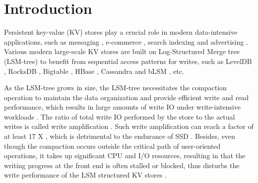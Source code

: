 \documentclass[sigconf]{acmart}
\begin{document}
\section{Introduction}
Persistent key-value (KV) stores play a crucial role in modern data-intensive applications, such as messaging \cite{HH,HBase}, e-commerce \cite{Dynamo}, search indexing \cite{LevelDB, Bigtable} and advertising \cite{RocksDB,PNUTS}. Various modern large-scale KV stores are built on Log-Structured Merge tree (LSM-tree) \cite{LSMtree} to benefit from sequential access patterns for writes, such as LevelDB \cite{LevelDB}, RocksDB \cite{RocksDB}, Bigtable \cite{Bigtable}, HBase \cite{HBase}, Cassandra \cite{Cassandra} and bLSM \cite{bLSM}, etc.

As the LSM-tree grows in size, the LSM-tree necessitates the compaction operation to maintain the data organization and provide efficient write and read performance, which results in large amounts of write IO under write-intensive workloads \cite{LevelDB, HyperLevelDB, RocksDB}. The ratio of total write IO performed by the store to the actual writes is called write amplification \cite{LevelDB, PebblesDB}. Such write amplification can reach a factor of at least 17 X \cite{Wisckey,PebblesDB}, which is detrimental to the endurance of SSD \cite{SSD, Wisckey, HashKV}. Besides, even though the compaction occurs outside the critical path of user-oriented operations, it takes up significant CPU and I/O resources, resulting in that the writing progress at the front end is often stalled or blocked, thus disturbs the write performance of the LSM structured KV stores \cite{TRIAD, PebblesDB}. 
\end{document}
